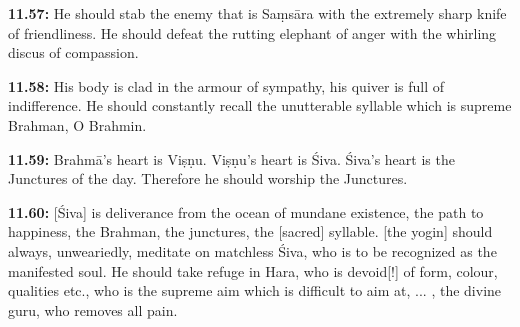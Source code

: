 \documentclass{article}
\newcommand{\vsnum}[1]{\textbf{#1}}
\begin{document}
\vsnum{11.57: }He should stab the enemy that is Saṃsāra with the extremely sharp knife of friendliness. He should defeat the rutting elephant of anger with the whirling discus of compassion.

\vsnum{11.58: }His body is clad in the armour of sympathy, his quiver is full of indifference. He should constantly recall the unutterable syllable which is supreme Brahman, O Brahmin.

\vsnum{11.59: }Brahmā's heart is Viṣṇu. Viṣṇu's heart is Śiva. Śiva's heart is the Junctures of the day. Therefore he should worship the Junctures.

\vsnum{11.60: }[Śiva] is deliverance from the ocean of mundane existence, the path to happiness, the Brahman, the junctures, the [sacred] syllable. [the yogin] should always, unweariedly, meditate on matchless Śiva, who is to be recognized as the manifested soul. He should take refuge in Hara, who is devoid[!] of form, colour, qualities etc., who is the supreme aim which is difficult to aim at, ... , the divine guru, who removes all pain.
\end{document}
